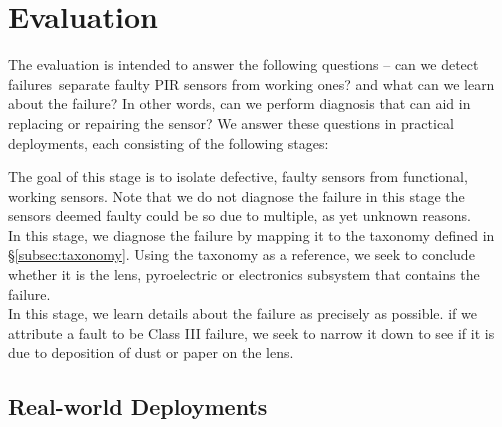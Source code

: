 \section{Evaluation}
\label{sec:evaluation}
The evaluation is intended to answer the following questions -- \ca can we detect failures~\ie separate faulty PIR sensors from working ones? and \cb what can we learn about the failure? In other words, can we perform diagnosis that can aid in replacing or repairing the sensor? We answer these questions in practical deployments, %
each consisting of the following stages:

 The goal of this stage is to isolate defective, faulty sensors from functional, working sensors. Note that we do not diagnose the failure in this stage \ie the sensors deemed faulty could be so due to multiple, as yet unknown reasons.\\
\hspace*{2ex} In this stage, we diagnose the failure by mapping it to the taxonomy defined in \S\ref{subsec:taxonomy}. Using the taxonomy as a reference, we seek to conclude whether it is the lens, pyroelectric or electronics subsystem that contains the failure.\\
\hspace*{2ex} In this stage, we learn details about the failure as precisely as possible. \Eg if we attribute a fault to be Class III failure, we seek to narrow it down to see if it is due to deposition of dust or paper on the lens.

\subsection{Real-world Deployments}
\label{subsec:deployment}


